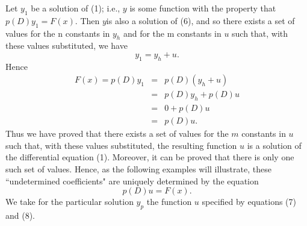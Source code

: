 Let $y_1$ be a solution of (1); i.e., $y$ is some function with the property that $p(D)y_1 = F(x)$. Then $y$is also a solution of (6), and so there exists a set of values for the n constants in $y_h$ and for the m constants in $u$ such that, with these values substituted, we have
$$
y_1 = y_h + u.
$$
Hence 
\begin{eqnarray*}
F(x) = p(D)y_1 &=& p(D)(y_h + u) \\
                        &=& p(D)y_h + p(D)u \\
                        &=& 0 + p(D)u \\
                        &=& p(D)u.
\end{eqnarray*}
Thus we have proved that there exists a set of values for the $m$ constants in $u$ such that, with these values substituted, the resulting function $u$ is a solution of the differential equation (1). Moreover, it can be proved that there is only one such set of values. Hence, as the following examples will illustrate, these ``undetermined coefficients" are uniquely determined by the equation
\begin{equation}
p(D)u = F(x).  
\label{eq11.5.8}
\end{equation}
We take for the particular solution $y_p$ the function $u$ specified by equations (7) and (8).

